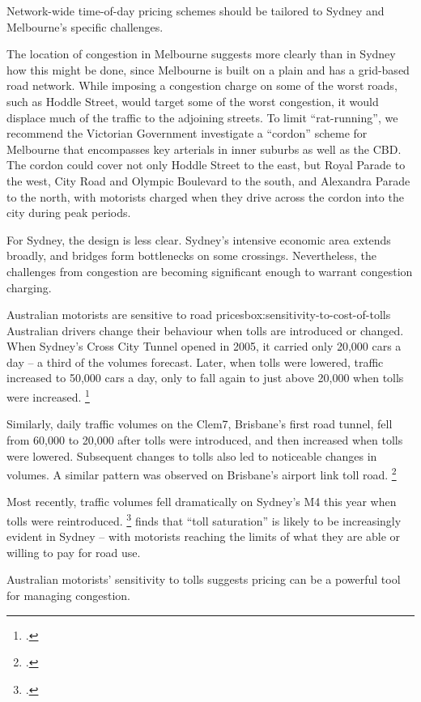 \documentclass{grattan}
\begin{document}
Network-wide time-of-day pricing schemes should be tailored to Sydney and Melbourne's specific challenges.

The location of congestion in Melbourne suggests more clearly than in Sydney how this might be done, since Melbourne is built on a plain and has a grid-based road network. While imposing a congestion charge on some of the worst roads, such as Hoddle Street, would target some of the worst congestion, it would displace much of the traffic to the adjoining streets. To limit ``rat-running'', we recommend the Victorian Government investigate a ``cordon'' scheme for Melbourne that encompasses key arterials in inner suburbs as well as the CBD\@.
The cordon could cover not only Hoddle Street to the east, but Royal Parade to the west, City Road and Olympic Boulevard to the south, and Alexandra Parade to the north, with motorists charged when they drive across the cordon into the city during peak periods.

For Sydney, the design is less clear. Sydney's intensive economic area extends broadly, and bridges form bottlenecks on some crossings. Nevertheless, the challenges from congestion are becoming significant enough to warrant congestion charging.


\begin{smallbox}{Australian motorists are sensitive to road prices}{box:sensitivity-to-cost-of-tolls}
Australian drivers change their behaviour when tolls are introduced or changed.
When Sydney's Cross City Tunnel opened in 2005, it carried only 20,000 cars a day -- a third of the volumes forecast.
Later, when tolls were lowered, traffic increased to 50,000 cars a day, only to fall again to just above 20,000 when tolls were increased.%
\footcite{Auditor-General-CCT}

Similarly, daily traffic volumes on the Clem7, Brisbane's first road tunnel, fell from 60,000 to 20,000 after tolls were introduced, and then increased when tolls were lowered.
Subsequent changes to tolls also led to noticeable changes in volumes.
A similar pattern was observed on Brisbane's airport link toll road.%
    \footcite{Loader-charting-transport-Traffic-volumes-on-Australian-toll-roads}

Most recently, traffic volumes fell dramatically on Sydney's M4 this year when tolls were reintroduced.%
    \footcite{OSullivan-2017-SMH-New-M4-toll-funnels-more-onto-Parramatta-Rd}
\textcite{Henscher-how-much-is-too-much-for-tolled-road-users} finds that ``toll saturation'' is likely to be increasingly evident in Sydney -- with motorists reaching the limits of what they are able or willing to pay for road use.

Australian motorists' sensitivity to tolls suggests pricing can be a powerful tool for managing congestion. 

\end{smallbox}
\end{document}
